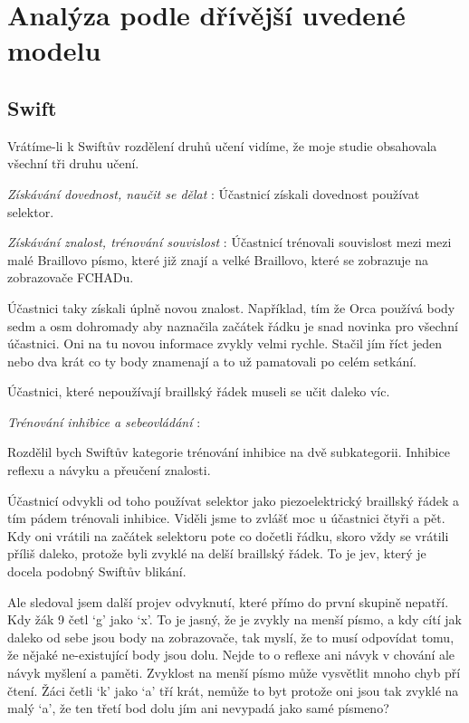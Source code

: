 \section{Analýza podle dřívější uvedené modelu}

\subsection{Swift}
Vrátíme-li k Swiftův rozdělení druhů učení vidíme, že moje studie obsahovala všechní tři druhu učení.

\textit{Získávání dovednost, naučit se dělat} :
Účastnicí získali dovednost používat selektor.

\textit{Získávání znalost, trénování souvislost} :
Účastnicí trénovali souvislost mezi mezi malé Braillovo písmo, které již znají a velké Braillovo, které se zobrazuje na zobrazovače FCHADu.

Účastnici taky získali úplně novou znalost.  Například, tím že Orca používá body sedm a osm dohromady aby naznačila začátek řádku je snad novinka pro všechní účastnici.  Oni na tu novou informace zvykly velmi rychle.  Stačil jím říct jeden nebo dva krát co ty body znamenají a to už pamatovali po celém setkání.

Účastnici, které nepoužívají braillský řádek museli se učit daleko víc.  

\textit{Trénování inhibice a sebeovládání} :

Rozdělil bych Swiftův kategorie trénování inhibice na dvě subkategorii.  Inhibice reflexu a návyku a přeučení znalosti.

Účastnicí odvykli od toho používat selektor jako piezoelektrický braillský řádek a tím pádem trénovali inhibice.  Viděli jsme to zvlášť moc u účastnici čtyři a pět.  Kdy oni vrátili na začátek selektoru pote co dočetli řádku, skoro vždy se vrátili příliš daleko, protože byli zvyklé na delší braillský řádek.  To je jev, který je docela podobný Swiftův blikání.

Ale sledoval jsem další projev odvyknutí, které přímo do první skupině nepatří. Kdy žák 9 četl `g' jako `x'. To je jasný, že je zvykly na menší písmo, a kdy cítí jak daleko od sebe jsou body na zobrazovače, tak myslí, že to musí odpovídat tomu, že nějaké ne-existující body jsou dolu.  Nejde to o reflexe ani návyk v chování ale návyk myšlení a paměti.  Zvyklost na menší písmo může vysvětlit mnoho chyb pří čtení.  Žáci četli `k' jako `a' tří krát, nemůže to byt protože oni jsou tak zvyklé na malý `a', že ten třetí bod dolu jím ani nevypadá jako samé písmeno?

